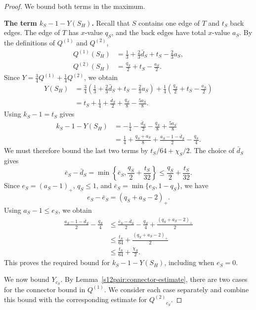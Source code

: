 \documentclass[11pt]{amsart}
\newcommand{\1}{\mathbbm{1}}
\begin{document}
\begin{proof}
We bound both terms in the maximum.

\smallskip\noindent
\textbf{The term $k_S-1-Y(S_H)$.}
Recall that $S$ contains one edge of $T$ and $t_S$ back edges.
The edge of $T$ has $x$-value $q_S$, and the back edges
have total $x$-value $a_S$.
By the definitions of ${Q^{(1)}}$ and ${Q^{(2)}}$, 
\[
 \begin{aligned}
 {Q^{(1)}}(S_H)
 &=\frac13+\frac23\bar d_S+t_S-\frac23a_S,\\[4pt]
 {Q^{(2)}}(S_H)
 &=\frac{q_S}{2}+t_S-\frac{a_S}{2}.
 \end{aligned}
\]
Since $Y=\frac34{Q^{(1)}}+\frac14{Q^{(2)}}$, we obtain
\[
 \begin{aligned}
 Y(S_H)
 &=\frac34\left(
      \frac13+\frac23\bar d_S+t_S-\frac23a_S
    \right)
   +\frac14\left(
      \frac{q_S}{2}+t_S-\frac{a_S}{2}
    \right)\\[4pt]
 &=t_S+\frac14+\frac{\bar d_S}{2}
       +\frac{q_S}{8}-\frac{5a_S}{8}.
 \end{aligned}
\]
{Using $k_S-1=t_S$ gives}
\[
 \begin{aligned}
 k_S-1-Y(S_H)
 &=-\frac14-\frac{\bar d_S}{2}
       -\frac{q_S}{8}+\frac{5a_S}{8}\\[4pt]
 &=\frac14+\frac{q_S+a_S}{8}
   +\frac{a_S-1-\bar d_S}{2}-\frac{q_S}{4}.
 \end{aligned}
\]
We must therefore bound the last two terms by
$t_S/64+\chi_S/2$. The choice of $\bar d_S$ gives
\[
 \bar e_S-\bar d_S
 =\min\left\{\bar e_S,\frac{q_S}{2}+\frac{t_S}{32}\right\}
 \le\frac{q_S}{2}+\frac{t_S}{32}.
\]
Since $e_S=(a_S-1)_+$, $q_S\le1$, and
$\bar e_S=\min\{e_S,1-q_S\}$, we have
\[
 e_S-\bar e_S=(q_S+a_S-2)_+.
\]
Using $a_S-1\le e_S$, we obtain
\[
 \begin{aligned}
 \frac{a_S-1-\bar d_S}{2}-\frac{q_S}{4}
 &\le\frac{\bar e_S-\bar d_S}{2}-\frac{q_S}{4}+\frac{(q_S+a_S-2)_+}{2}\\
 &\le\frac{t_S}{64}+\frac{(q_S+a_S-2)_+}{2}\\
 &\le\frac{t_S}{64}+\frac{\chi_S}{2}.
 \end{aligned}
\]
This proves the required bound for $k_S-1-Y(S_H)$, including
when $e_S=0$.

We now bound $Y_{c_S}$. By
Lemma~\ref{s12pair:connector-estimate}, there are two cases
for the connector bound in ${Q^{(1)}}$. We consider each case
separately and combine this bound with the corresponding
estimate for ${Q^{(2)}}_{c_S}$.


\end{proof}
\end{document}
